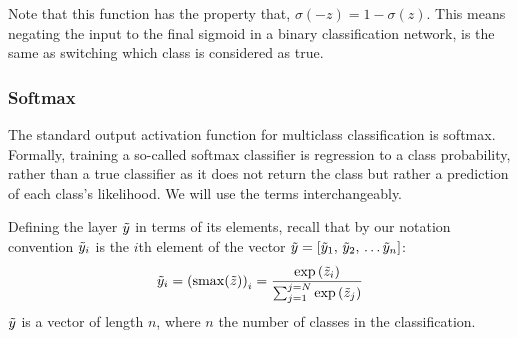 \documentclass[12pt,parskip]{komatufte}
\begin{document}
Note that this function has the property that, $\sigma(-z)=1-\sigma(z)$.
This means negating the input to the final sigmoid in a binary classification network,
is the same as switching which class is considered as true.



\subsubsection{Softmax}
The standard output activation function for multiclass classification is softmax.
Formally, training a so-called softmax classifier is regression to a class probability, rather than a true classifier as it does not return the class but rather a prediction of each class's likelihood.
We will use the terms interchangeably.

Defining the layer $\tilde{y}$ in terms of its elements,
recall that by our notation convention $\iv y_i$ is the $i$th element of the vector $\v y=\left[\iv y_1,\,\iv y_2,\,\ldots \iv y_n\right]$:
\begin{equation}
\iv y_i=\i {\left(\softmax(\v z)\right)}_i= \frac{\exp{\iv z_i}}{\sum_{j=1}^{j=N} \exp{\iv z_j}}
\end{equation}
$\tilde{y}$ is a vector of length $n$, where $n$ the number of classes in the classification.
\end{document}
